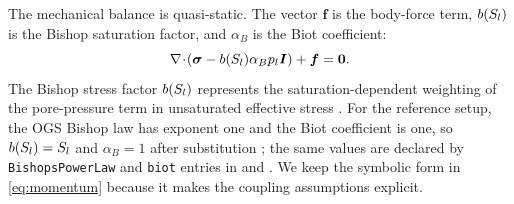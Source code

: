 The mechanical balance is quasi-static.  The vector \(\bm{f}\) is the body-force
term, \(b(S_l)\) is the Bishop saturation factor, and \(\alpha_B\) is the Biot
coefficient:
\begin{equation}
  \nabla\!\cdot\!\left(\bm{\sigma} - b(S_l)\alpha_Bp_l\bm{I}\right) + \bm{f} = \bm{0}.
  \label{eq:momentum}
\end{equation}
The Bishop stress factor \(b(S_l)\) represents the saturation-dependent weighting of
the pore-pressure term in unsaturated effective stress
\citep[bibliographic record, no DOI found]{Bishop1959EffectiveStress}.  For the
reference setup, the OGS Bishop law has exponent one and the Biot coefficient is
one, so \(b(S_l)=S_l\) and \(\alpha_B=1\) after substitution
\citep[TRM momentum equation and media-property table]{OpenGeoSysTRMDocs}; the
same values are declared by \texttt{BishopsPowerLaw} and \texttt{biot} entries in
 and .  We keep the
symbolic form in \eqref{eq:momentum} because it makes the coupling assumptions
explicit.


